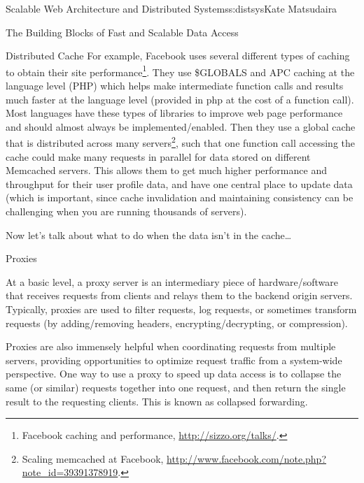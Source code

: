 \begin{aosachapter}{Scalable Web Architecture and Distributed Systems}{s:distsys}{Kate Matsudaira}
\begin{aosasect1}{The Building Blocks of Fast and Scalable Data Access}
\begin{aosasect2}{Distributed Cache}
For example, Facebook uses several different types of caching to
obtain their site performance\footnote{Facebook caching and
  performance, \url{http://sizzo.org/talks/}.}. They use \$GLOBALS and
APC caching at the language level (PHP) which helps make intermediate
function calls and results much faster at the language level (provided
in php at the cost of a function call). Most languages have these
types of libraries to improve web page performance and should almost
always be implemented/enabled. Then they use a global cache that is
distributed across many servers\footnote{Scaling memcached at
  Facebook,
  \url{http://www.facebook.com/note.php?note_id=39391378919}.}, such
that one function call accessing the cache could make many requests in
parallel for data stored on different Memcached servers. This allows
them to get much higher performance and throughput for their user
profile data, and have one central place to update data (which is
important, since cache invalidation and maintaining consistency can be
challenging when you are running thousands of servers).

Now let's talk about what to do when the data isn't in the cache{\ldots}

\end{aosasect2}

\begin{aosasect2}{Proxies}

At a basic level, a proxy server is an intermediary piece of
hardware/software that receives requests from clients and relays them
to the backend origin servers. Typically, proxies are used to filter
requests, log requests, or sometimes transform requests (by
adding/removing headers, encrypting/decrypting, or compression).


Proxies are also immensely helpful when coordinating requests from
multiple servers, providing opportunities to optimize request traffic
from a system-wide perspective. One way to use a proxy to speed up
data access is to collapse the same (or similar) requests together
into one request, and then return the single result to the requesting
clients. This is known as collapsed forwarding.


\end{aosasect2}
\end{aosasect1}
\end{aosachapter}
